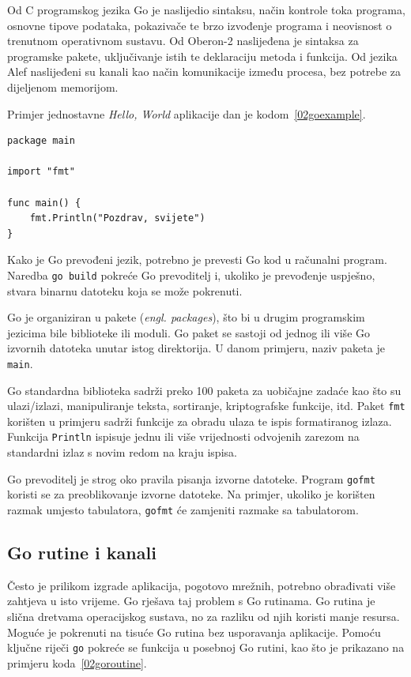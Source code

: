 Od C programskog jezika Go je naslijedio sintaksu, način kontrole toka programa, osnovne tipove
podataka, pokazivače te brzo izvođenje programa i neovisnost o trenutnom operativnom sustavu.
Od Oberon-2 naslijeđena je sintaksa za programske pakete, uključivanje istih te deklaraciju metoda
i funkcija. Od jezika Alef naslijeđeni su kanali kao način komunikacije između procesa, bez potrebe
za dijeljenom memorijom.

Primjer jednostavne \textit{Hello, World} aplikacije dan je kodom~\ref{02goexample}.

\begin{lstlisting}[float=h]
package main

import "fmt"

func main() {
    fmt.Println("Pozdrav, svijete")
}
\end{lstlisting}

Kako je Go prevođeni jezik, potrebno je prevesti Go kod u računalni program. Naredba \texttt{go
build} pokreće Go prevoditelj i, ukoliko je prevođenje uspješno, stvara binarnu datoteku koja se
može pokrenuti.

Go je organiziran u pakete (\textit{engl. packages}), što bi u drugim programskim jezicima bile
biblioteke ili moduli. Go paket se sastoji od jednog ili više Go izvornih datoteka unutar istog
direktorija. U danom primjeru, naziv paketa je \texttt{main}.

Go standardna biblioteka sadrži preko 100 paketa za uobičajne zadaće kao što su ulazi/izlazi,
manipuliranje teksta, sortiranje, kriptografske funkcije, itd. Paket \texttt{fmt} korišten u
primjeru sadrži funkcije za obradu ulaza te ispis formatiranog izlaza. Funkcija \texttt{Println}
ispisuje jednu ili više vrijednosti odvojenih zarezom na standardni izlaz s novim redom na kraju
ispisa.

Go prevoditelj je strog oko pravila pisanja izvorne datoteke. Program \texttt{gofmt} koristi se za
preoblikovanje izvorne datoteke. Na primjer, ukoliko je korišten razmak umjesto tabulatora,
\texttt{gofmt} će zamjeniti razmake sa tabulatorom.

\subsection{Go rutine i kanali}
Često je prilikom izgrade aplikacija, pogotovo mrežnih, potrebno obrađivati više zahtjeva u isto
vrijeme. Go rješava taj problem s Go rutinama. Go rutina je slična dretvama operacijskog sustava,
no za razliku od njih koristi manje resursa. Moguće je pokrenuti na tisuće Go rutina bez usporavanja
aplikacije. Pomoću ključne riječi \texttt{go} pokreće se funkcija u posebnoj Go rutini, kao što je
prikazano na primjeru koda~\ref{02goroutine}.

